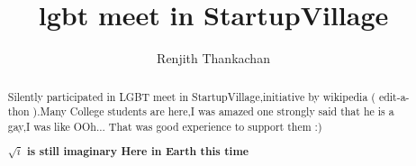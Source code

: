 \documentclass[]{article}
\begin{document}
\title{lgbt meet in StartupVillage}
\author{Renjith Thankachan}
\maketitle

\begin{abstract}
Silently participated in LGBT meet in StartupVillage,initiative by wikipedia ( edit-a-thon ).Many College students are here,I was amazed one strongly said that he is a gay,I was like OOh... That was good experience to support them :)

\textbf{$\sqrt{i}$ is still imaginary Here in Earth this time}
\end{abstract}
\end{document}
